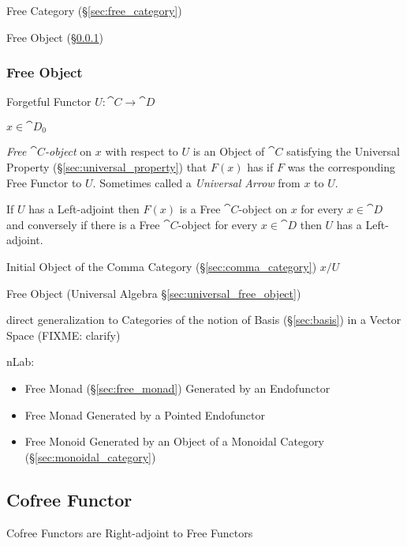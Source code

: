 Free Category (\S\ref{sec:free_category})

Free Object (\S\ref{sec:free_object})



\subsubsection{Free Object}\label{sec:free_object}

Forgetful Functor $U : \cat{C} \rightarrow \cat{D}$

$x \in \cat{D}_0$

\emph{Free $\cat{C}$-object} on $x$ with respect to $U$ is an Object
of $\cat{C}$ satisfying the Universal Property
(\S\ref{sec:universal_property}) that $F(x)$ has if $F$ was the
corresponding Free Functor to $U$. Sometimes called a \emph{Universal
  Arrow} from $x$ to $U$.

If $U$ has a Left-adjoint then $F(x)$ is a Free $\cat{C}$-object on
$x$ for every $x \in \cat{D}$ and conversely if there is a Free
$\cat{C}$-object for every $x \in \cat{D}$ then $U$ has a
Left-adjoint.

Initial Object of the Comma Category (\S\ref{sec:comma_category}) $x /
U$

\fist Free Object (Universal Algebra \S\ref{sec:universal_free_object})

direct generalization to Categories of the notion of Basis (\S\ref{sec:basis})
in a Vector Space (FIXME: clarify)

nLab:

\begin{itemize}
  \item Free Monad (\S\ref{sec:free_monad}) Generated by an Endofunctor
  \item Free Monad Generated by a Pointed Endofunctor
  \item Free Monoid Generated by an Object of a Monoidal Category
    (\S\ref{sec:monoidal_category})
\end{itemize}



\subsection{Cofree Functor}\label{sec:cofree_functor}

Cofree Functors are Right-adjoint to Free Functors

